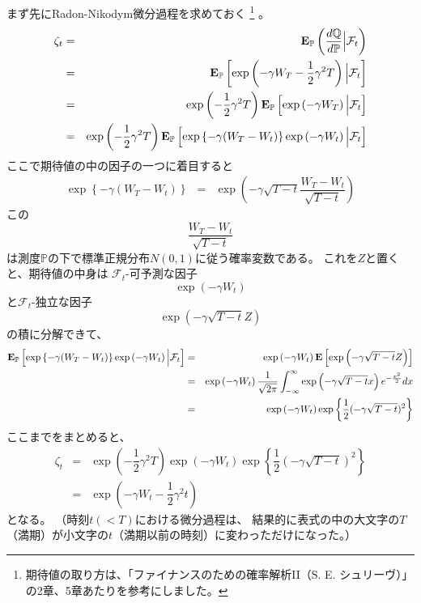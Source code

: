 \documentclass[uplatex,a4j,12pt,dvipdfmx]{jsarticle}
\begin{document}
まず先にRadon-Nikodym微分過程を求めておく
\footnote{期待値の取り方は、「ファイナンスのための確率解析II（S. E. シュリーヴ）」の2章、5章あたりを参考にしました。}
。
%
\begin{eqnarray*}
	\zeta_{t}
	&=&
	{\bf E}_{\mathbb{P}}
	\left( \dfrac{ d \mathbb{Q} }{ d \mathbb{P} } \Big| \mathcal{F}_{t} \right)
	\\ &=&
	{\bf E}_{\mathbb{P}}
	\left[ \exp \left( - \gamma W_{T} - \dfrac{1}{2} \gamma^{2} T \right)
		\Big| \mathcal{F}_{t} \right]
	\\ &=&
	\exp \left( - \dfrac{1}{2} \gamma^{2} T \right)
	{\bf E}_{\mathbb{P}}
	\left[ \exp \left( - \gamma W_{T} \right)
		\Big| \mathcal{F}_{t} \right]
	\\ &=&
	\exp \left( - \dfrac{1}{2} \gamma^{2} T \right)
	{\bf E}_{\mathbb{P}}
	\left[
		\exp \left\{ - \gamma ( W_{T} - W_{t} ) \right\}
		\exp \left( - \gamma W_{t} \right)
		\Big| \mathcal{F}_{t} \right]
\end{eqnarray*}
%
ここで期待値の中の因子の一つに着目すると
%
\begin{eqnarray*}
	\exp \left\{ - \gamma ( W_{T} - W_{t} ) \right\}
	&=&
	\exp \left( - \gamma \sqrt{T - t} \dfrac{ W_{T} - W_{t} }{ \sqrt{T - t} } \right)
\end{eqnarray*}
%
この
$$
	\dfrac{ W_{T} - W_{t} }{ \sqrt{T - t} }
$$
は測度$\mathbb{P}$の下で標準正規分布$N(0,1)$に従う確率変数である。
これを$Z$と置くと、期待値の中身は
$\mathcal{F}_{t}$-可予測な因子
$$
	\exp \left( - \gamma W_{t} \right)
$$
と$\mathcal{F}_{t}$-独立な因子
$$
	\exp \left( - \gamma \sqrt{T - t} Z \right)
$$
の積に分解できて、
%
\begin{eqnarray*}
	{\bf E}_{\mathbb{P}}
	\left[
		\exp \left\{ - \gamma ( W_{T} - W_{t} ) \right\}
		\exp \left( - \gamma W_{t} \right)
		\Big| \mathcal{F}_{t} \right]
	&=&
	\exp \left( - \gamma W_{t} \right)
	{\bf E}
	\left[
		\exp \left( - \gamma \sqrt{T - t} Z \right)
		\right]
	\\ &=&
	\exp \left( - \gamma W_{t} \right)
	\dfrac{1}{\sqrt{2\pi}}
	\int^{\infty}_{-\infty}
	\exp \left( - \gamma \sqrt{T - t} x \right)
	e^{-\frac{x^{2}}{2}}
	dx
	\\ &=&
	\exp \left( - \gamma W_{t} \right)
	\exp \left\{ \dfrac{1}{2} (- \gamma \sqrt{T - t} )^{2} \right\}
\end{eqnarray*}
%
ここまでをまとめると、
%
\begin{eqnarray*}
	\zeta_{t}
	&=&
	\exp \left( - \dfrac{1}{2} \gamma^{2} T \right)
	\exp \left( - \gamma W_{t} \right)
	\exp \left\{ \dfrac{1}{2} (- \gamma \sqrt{T - t} )^{2} \right\}
	\\ &=&
	\exp \left( - \gamma W_{t} - \dfrac{1}{2} \gamma^{2} t \right)
\end{eqnarray*}
%
となる。
（時刻$t(<T)$における微分過程は、
結果的に表式の中の大文字の$T$（満期）が小文字の$t$（満期以前の時刻）に変わっただけになった。）
${}$
\end{document}
